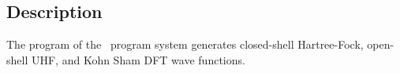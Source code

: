 
\section{}
\label{UG:sec:scf}

\subsection{Description}
\label{UG:sec:scf_description}

The  program of the \molcas\ program system generates
closed-{}shell Hartree-Fock, open-{}shell UHF, and Kohn Sham DFT wave functions.

